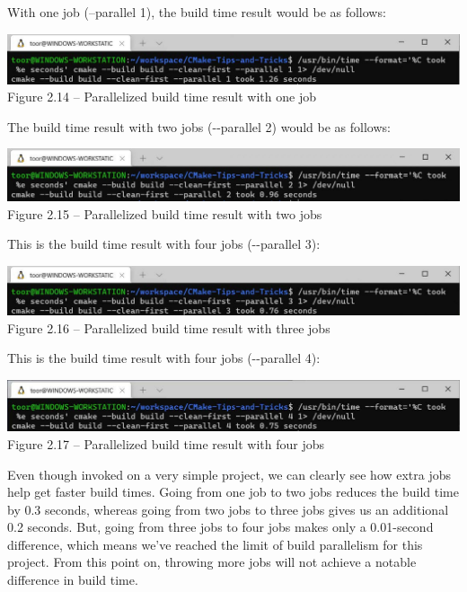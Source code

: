 With one job (--parallel 1), the build time result would be as follows:

\begin{center}
\includegraphics[width=1.\textwidth]{content/1/chapter2/images/14.jpg}\\
Figure 2.14 – Parallelized build time result with one job
\end{center}

The build time result with two jobs (-{}-parallel 2) would be as follows:

\begin{center}
\includegraphics[width=1.\textwidth]{content/1/chapter2/images/15.jpg}\\
Figure 2.15 – Parallelized build time result with two jobs
\end{center}

This is the build time result with four jobs (-{}-parallel 3):

\begin{center}
\includegraphics[width=1.\textwidth]{content/1/chapter2/images/16.jpg}\\
Figure 2.16 – Parallelized build time result with three jobs
\end{center}

This is the build time result with four jobs (-{}-parallel 4):

\begin{center}
\includegraphics[width=1.\textwidth]{content/1/chapter2/images/17.jpg}\\
Figure 2.17 – Parallelized build time result with four jobs
\end{center}

Even though invoked on a very simple project, we can clearly see how extra jobs help get faster build times. Going from one job to two jobs reduces the build time by 0.3 seconds, whereas going from two jobs to three jobs gives us an additional 0.2 seconds. But, going from three jobs to four jobs makes only a 0.01-second difference, which means we've reached the limit of build parallelism for this project. From this point on, throwing more jobs will not achieve a notable difference in build time.


